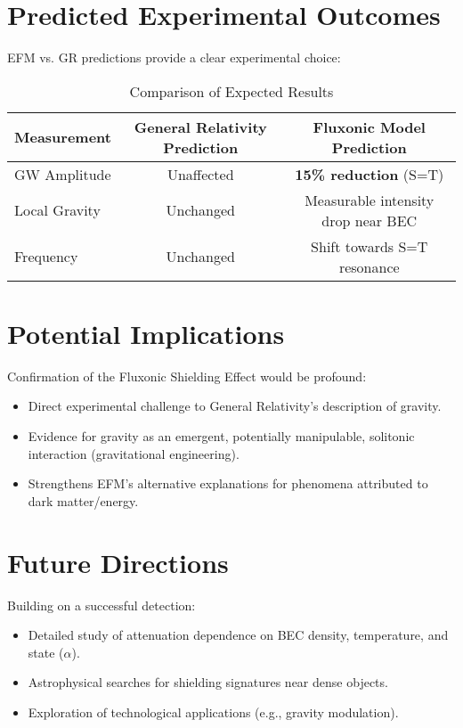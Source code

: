 \documentclass[11pt]{article}
\begin{document}
\section{Predicted Experimental Outcomes}
EFM vs. GR predictions provide a clear experimental choice:
\begin{table}[htbp] %
    \centering
    \caption{Comparison of Expected Results}
    \label{tab:predictions}
    \begin{tabular}{@{}lcc@{}} %
        \toprule
        Measurement & General Relativity Prediction & Fluxonic Model Prediction \\
        \midrule
        GW Amplitude & Unaffected & \textbf{15\% reduction} (S=T) \\
        Local Gravity & Unchanged & Measurable intensity drop near BEC \\
        Frequency & Unchanged & Shift towards S=T resonance \\
        \bottomrule
    \end{tabular}
\end{table}

\section{Potential Implications}
Confirmation of the Fluxonic Shielding Effect would be profound:
\begin{itemize}
    \item Direct experimental challenge to General Relativity's description of gravity.
    \item Evidence for gravity as an emergent, potentially manipulable, solitonic interaction (gravitational engineering).
    \item Strengthens EFM's alternative explanations for phenomena attributed to dark matter/energy.
\end{itemize}

\section{Future Directions}
Building on a successful detection:
\begin{itemize}
    \item Detailed study of attenuation dependence on BEC density, temperature, and state (\(\alpha\)).
    \item Astrophysical searches for shielding signatures near dense objects.
    \item Exploration of technological applications (e.g., gravity modulation).
\end{itemize}
\end{document}
